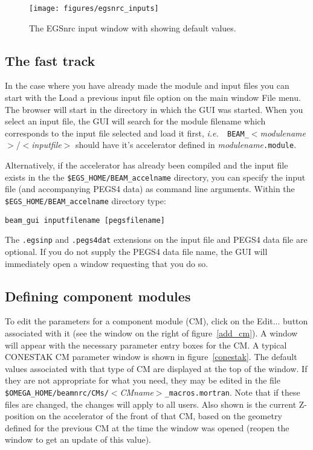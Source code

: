\documentclass[12pt,twoside]{article}
\newcommand{\ie}{{\em i.e.}}
\begin{document}
\begin{figure}[htb]
\begin{center}
\leavevmode
\texttt{[image: figures/egsnrc\_inputs]}
\end{center}
\caption{The EGSnrc input window with showing default values.}
\label{egsnrcwindow}
\end{figure}

\subsection{The fast track}

In the case where you have already made the module and input files you can start with the {\sf Load a
previous input file} option on the main window {\sf File} menu.  The browser
will start in the directory in which the GUI was started.  When you
select an input file, the GUI will search for the module filename which
corresponds to the input file selected and load it first, \ie~{\tt
BEAM\_}$<${\em modulename}$>$/$<${\em inputfile}$>$ should have it's
accelerator defined in {\em modulename}{\tt .module}.

Alternatively, if the accelerator has already been compiled and the input file exists
in the the {\tt \$EGS\_HOME/BEAM\_accelname} directory, you can specify the input file
(and accompanying PEGS4 data) as command line arguments.  Within the
{\tt \$EGS\_HOME/BEAM\_accelname} directory type:
\begin{verbatim}
beam_gui inputfilename [pegsfilename]
\end{verbatim}
The {\tt .egsinp} and {\tt .pegs4dat} extensions on the input file and PEGS4 data file are
optional.  If you do not supply the PEGS4 data file name, the GUI will immediately
open a window requesting that you do so.

\subsection{Defining component modules}

To edit the parameters for a component module (CM), click on the {\sf
Edit...} button associated with it (see the window on the right of
figure~\ref{add_cm}). A window will appear
with the necessary parameter entry boxes for the CM.  A typical CONESTAK
CM parameter window is shown in figure~\ref{conestak}.  The default
values associated with that type of CM are displayed at the top of the
window.  If they are not appropriate for what you need, they may be
edited in the file
{\tt \$OMEGA\_HOME/beamnrc/CMs/}$<${\em CMname}$>${\tt \_macros.mortran}.
Note that if these files are changed, the changes will apply to all
users.  Also
shown is the current Z-position on the accelerator of the front of that
CM, based on the geometry defined for the previous CM at the time the
window was opened (reopen the window to get an update of this value).
\end{document}
